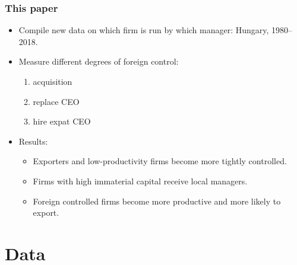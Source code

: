 \documentclass[aspectratio=43,compress,mathserif]{beamer}
\begin{document}
\begin{frame}\frametitle{This paper}\hypertarget{This paper}{}
\begin{itemize}
\item Compile new data on which firm is run by which manager: Hungary, 1980--2018. 

\item Measure different degrees of foreign control:
\begin{enumerate}\setcounter{enumi}{0}
\item acquisition

\item replace CEO

\item hire expat CEO
\end{enumerate}

\item Results:
\begin{itemize}
\item Exporters and low-productivity firms become more tightly controlled. 

\item Firms with high immaterial capital receive local managers.

\item Foreign controlled firms become more productive and more likely to export. 




\end{itemize}

\end{itemize}
\end{frame}







\section{Data}\hypertarget{Data}{}
\end{document}

